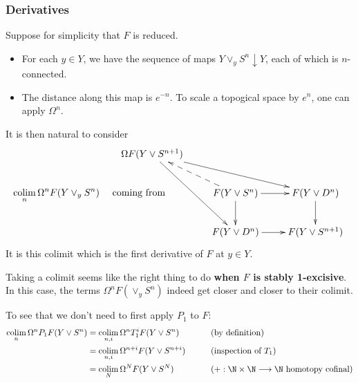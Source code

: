 \documentclass[11pt]{article}
\begin{document}
\begin{Calculus II}
\subsubsection*{Derivatives}
Suppose for simplicity that $F$ is reduced.
\begin{itemize}\squishlist
\setlength{\parindent}{.25in}
\item For each $y\in Y$, we have the sequence of maps $Y\vee _y S^n\downarrow Y$, each of which is $n$-connected.
\item The distance along this map is $e^{-n}$. To scale a topogical space by $e^n$, one can apply $\Omega^n$.
\end{itemize}
It is then natural to consider
\[\colim_{n}\Omega^nF(Y\vee _yS^n)\quad \textup{\ coming \makebox[-1cm][l]{from}}
\vcenter{\xymatrix{
\Omega F(Y\vee S^{n+1})
\ar[drr]
\ar[drrld]
&%
&%
\\%
&
F(Y\vee S^{n})
\ar[r]
\ar[d]
\ar@{-->}[ul]
&%
F(Y\vee D^n)
\ar[d]
\\%
&
F(Y\vee D^n)\ar[r]
&%
F(Y\vee S^{n+1})
}}\]
It is this colimit which is the first derivative of $F$ at $y\in Y$.
\begin{shaded}
\begin{itemise}
\setlength{\parindent}{.25in}
\item Taking a colimit seems like the right thing to do \textbf{when $F$ is stably 1-excisive}. In this case, the terms $\Omega^nF(\vee _yS^n)$ indeed get closer and closer to their colimit.
\item To see that we don't need to first apply $P_1$ to $F$:
\begin{alignat*}{2}
\colim_n\Omega^nP_1F(Y\vee S^n)
&=
\colim_{n,i}\Omega^n T_1^iF(Y\vee S^n)%
&\qquad&\text{(by definition)}\\
&=
\colim_{n,i}\Omega^{n+i} F(Y\vee S^{n+i})%
&\qquad&\text{(inspection of $T_1$)}\\
&=
\colim_{N}\Omega^N F(Y\vee S^{N})%
&\qquad&\text{($+:\N\times\N\to\N$ homotopy cofinal)}
\end{alignat*}
\end{itemise}
\end{shaded}

\pagebreak


\end{Calculus II}
\end{document}
